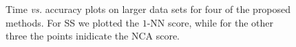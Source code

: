       \begin{figure}
		\centering
		\caption{\small Time \textsl{vs.} accuracy plots on larger data sets for four of the proposed methods. For SS we plotted the $1$-NN score, while for the other three the points inidicate the NCA score.}
		\label{fig:time-accuracy}
      \end{figure}

